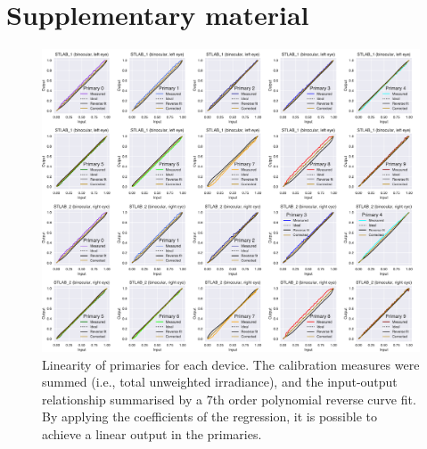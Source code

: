 \documentclass[
]{article}
\begin{document}
\pagebreak

\hypertarget{supplementary-material}{%
\section{Supplementary material}\label{supplementary-material}}

\setcounter{table}{0} \renewcommand{\thetable}{S\arabic{table}} \setcounter{figure}{0} \renewcommand{\thefigure}{S\arabic{figure}}

\begin{figure}

{\centering \includegraphics{Figures/gamma_figure} 

}

\caption{Linearity of primaries for each device. The calibration measures were summed (i.e., total unweighted irradiance), and the input-output relationship summarised by a 7th order polynomial reverse curve fit. By applying the coefficients of the regression, it is possible to achieve a linear output in the primaries.}\label{fig:primarylinearity}
\end{figure}
\end{document}
